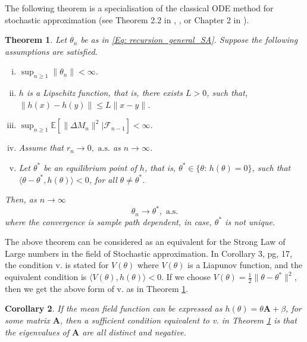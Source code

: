 \documentclass{article}
\numberwithin{equation}{section}
\newtheorem{theorem}{Theorem}[section]
\newtheorem{corollary}[theorem]{Corollary}
\newcommand{\FF}{\mbox{${\mathcal F}$}}
\newcommand{\1}{\mathbf{1}}
\newcommand{\0}{\mathbf{0}}
\newcommand{\E}{\mbox{${\mathbb E}$}}
\begin{document}
The following theorem is a specialisation of the classical ODE method for stochastic approximation (see Theorem 2.2 in \cite{Borkar_Meyn2000}, \cite{Benaim1996}, or  Chapter 2 in \cite{Borkar}).
\begin{theorem}
\label{Thm: SA_SLLN}
Let $\theta_n$ be as in \eqref{Eq: recursion_general_SA}. Suppose the following assumptions are satisfied. 
\begin{enumerate}[i.]
\item $\sup_{n \ge 1} \lVert \theta_n \rVert < \infty$. 
\item $h$ is a Lipschitz function, that is, there exists $L>0$, such that, $\lVert h(x)-h(y) \rVert \le L \lVert x-y\rVert$.
\item $\sup_{n \ge 1} \E \left[ \lVert \Delta M_{n}\rVert ^2 |\FF_{n-1} \right] < \infty$.
\item Assume that $r_n \longrightarrow 0, \text{ a.s.}$ as $n \to \infty$.
\item Let $\theta^*$ be an equilibrium point of $h$, that is, $\theta^* \in \{\theta: \, h(\theta)=0\}$, such that $\langle \theta-\theta^*, h(\theta)\rangle <0$, for all $\theta \neq \theta^*$.
\end{enumerate}
Then, as $n \to \infty$
\begin{equation}
\label{Eq:SA_SLLN}
\theta_n \longrightarrow \theta^*, \text { a.s.}
\end{equation}
where the convergence is sample path dependent, in case, $\theta^*$ is not unique.
\end{theorem}
The above theorem can be considered as an equivalent for the Strong Law of Large numbers in the field of Stochastic approximation. 
In \cite{Borkar} Corollary 3, pg, 17, the condition v. is stated for $V(\theta)$ where $V(\theta)$ is a Liapunov function, and the equivalent condition is $\langle V(\theta), h(\theta)\rangle <0$. If we choose $V(\theta)= \frac{1}{2} \lVert \theta-\theta^* \rVert ^2$, then we get the above form of v. as in Theorem \ref{Thm: SA_SLLN}.
\begin{corollary}
\label{Cor: SA_SLLN}
If the mean field function can be expressed as $h(\theta) = \theta  \mathbf{A} + \beta$, for some matrix $\mathbf{A}$, then a sufficient condition equivalent to v. in Theorem \ref{Thm: SA_SLLN} is that the eigenvalues of $\mathbf{A}$ are all distinct and negative.   
\end{corollary}
\end{document}
